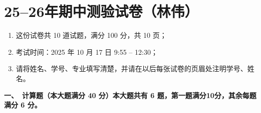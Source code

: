 
\section{25--26年期中测验试卷（林伟）}

\begin{enumerate}
    \item 这份试卷共 10 道试题，满分 100 分，共 10 页；
    \item 考试时间：2025 年 10 月 17 日 9:55 -- 12:30；
    \item 请将姓名、学号、专业填写清楚，并请在以后每张试卷的页眉处注明学号、姓名。
\end{enumerate}

\textbf{一、\ 计算题（本大题满分 40 分）本大题共有 6 题，第一题满分10分，其余每题满分 6 分。}

